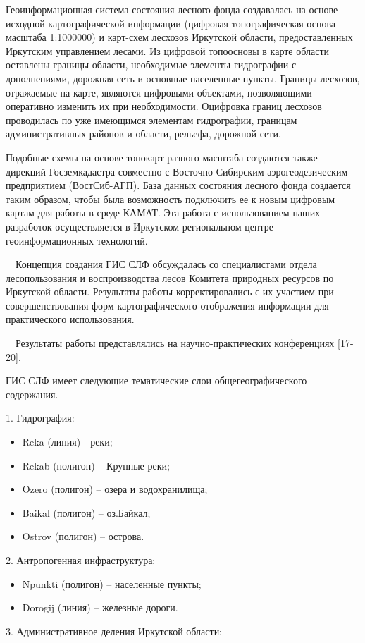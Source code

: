 \documentclass{report}
\begin{document}
Геоинформационная система состояния лесного фонда создавалась на основе исходной картографической информации (цифровая
топографическая основа масштаба 1:1000000) и карт-схем лесхозов Иркутской области, предоставленных Иркутским
управлением лесами. Из цифровой топоосновы в карте области оставлены границы области, необходимые элементы гидрографии
с дополнениями, дорожная сеть и основные населенные пункты. Границы лесхозов, отражаемые на карте, являются цифровыми
объектами, позволяющими оперативно изменить их при необходимости. Оцифровка границ лесхозов проводилась по уже
имеющимся элементам гидрографии, границам административных районов и области, рельефа, дорожной сети. 

Подобные схемы на основе топокарт разного масштаба создаются также дирекций Госземкадастра совместно с
Восточно-Сибирским аэрогеодезическим предприятием (ВостСиб-АГП). База данных состояния  лесного фонда создается таким
образом, чтобы была возможность подключить ее к новым цифровым картам для работы в среде КАМАТ. Эта работа с
использованием наших разработок осуществляется в Иркутском региональном центре геоинформационных технологий. 

\ \ Концепция создания ГИС СЛФ обсуждалась со специалистами отдела лесопользования и воспроизводства лесов Комитета
природных ресурсов по Иркутской области. Результаты работы корректировались с их участием при совершенствования форм
картографического отображения информации для практического использования. 

\ \ Результаты работы представлялись на научно-практических конференциях [17-20]. 

ГИС СЛФ имеет следующие тематические слои общегеографического содержания. 

1. Гидрография:

\begin{itemize}
\item Reka (линия) - реки;
\item Rekab (полигон) – Крупные реки;
\item Ozero (полигон) – озера и водохранилища;
\end{itemize}
\begin{itemize}
\item Baikal (полигон) – оз.Байкал;
\item Ostrov (полигон) – острова.
\end{itemize}
2. Антропогенная инфраструктура:

\begin{itemize}
\item Npunkti (полигон) – населенные пункты;
\item Dorogij (линия) – железные дороги.
\end{itemize}
3. Административное деления Иркутской области:
\end{document}
